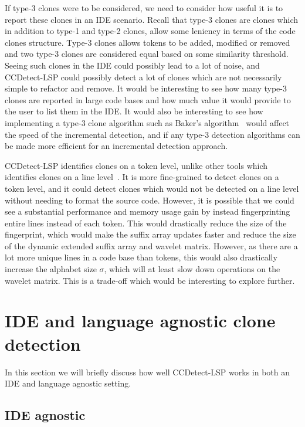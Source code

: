 If type-3 clones were to be considered, we need to consider how useful it is to report
these clones in an IDE scenario. Recall that type-3 clones are clones which in addition to
type-1 and type-2 clones, allow some leniency in terms of the code clones structure.
Type-3 clones allows tokens to be added, modified or removed and two type-3 clones are
considered equal based on some similarity threshold. Seeing such clones in the IDE could
possibly lead to a lot of noise, and CCDetect-LSP could possibly detect a lot of clones
which are not necessarily simple to refactor and remove. It would be interesting to see
how many type-3 clones are reported in large code bases and how much value it would
provide to the user to list them in the IDE. It would also be interesting to see how
implementing a type-3 clone algorithm such as Baker's
algorithm~\cite{BakerSparseDynamicProgramming} would affect the speed of the incremental
detection, and if any type-3 detection algorithms can be made more efficient for an
incremental detection approach.

CCDetect-LSP identifies clones on a token level, unlike other tools which identifies
clones on a line level~\cite{Zibran_real_time_search}. It is more fine-grained to detect
clones on a token level, and it could detect clones which would not be detected on a line
level without needing to format the source code. However, it is possible that we could see
a substantial performance and memory usage gain by instead fingerprinting entire lines
instead of each token. This would drastically reduce the size of the fingerprint, which
would make the suffix array updates faster and reduce the size of the dynamic extended
suffix array and wavelet matrix. However, as there are a lot more unique lines in a code
base than tokens, this would also drastically increase the alphabet size $\sigma$, which
will at least slow down operations on the wavelet matrix. This is a trade-off which would
be interesting to explore further.

\section{IDE and language agnostic clone detection}

In this section we will briefly discuss how well CCDetect-LSP works in both an IDE and
language agnostic setting.

\subsection*{IDE agnostic}

